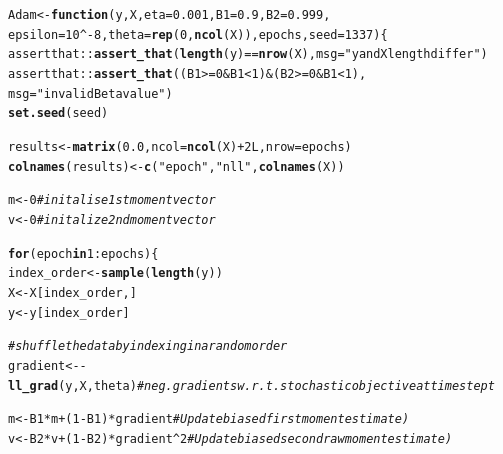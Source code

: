 \documentclass[11pt, a4paper, english]{article}\usepackage[]{graphicx}\usepackage[dvipsnames]{xcolor}
\makeatletter
\newcommand{\hlnum}[1]{\textcolor[rgb]{0.686,0.059,0.569}{#1}}%
\newcommand{\hlstr}[1]{\textcolor[rgb]{0.192,0.494,0.8}{#1}}%
\newcommand{\hlcom}[1]{\textcolor[rgb]{0.678,0.584,0.686}{\textit{#1}}}%
\newcommand{\hlopt}[1]{\textcolor[rgb]{0,0,0}{#1}}%
\newcommand{\hlstd}[1]{\textcolor[rgb]{0.345,0.345,0.345}{#1}}%
\newcommand{\hlkwa}[1]{\textcolor[rgb]{0.161,0.373,0.58}{\textbf{#1}}}%
\newcommand{\hlkwb}[1]{\textcolor[rgb]{0.69,0.353,0.396}{#1}}%
\newcommand{\hlkwc}[1]{\textcolor[rgb]{0.333,0.667,0.333}{#1}}%
\newcommand{\hlkwd}[1]{\textcolor[rgb]{0.737,0.353,0.396}{\textbf{#1}}}%
\newenvironment{kframe}{%
 \def\at@end@of@kframe{}%
 \ifinner\ifhmode%
  \def\at@end@of@kframe{\end{minipage}}%
  \begin{minipage}{\columnwidth}%
 \fi\fi%
 \def\FrameCommand##1{\hskip\@totalleftmargin \hskip-\fboxsep
 \colorbox{shadecolor}{##1}\hskip-\fboxsep
     \hskip-\linewidth \hskip-\@totalleftmargin \hskip\columnwidth}%
 \MakeFramed {\advance\hsize-\width
   \@totalleftmargin\z@ \linewidth\hsize
   \@setminipage}}%
 {\par\unskip\endMakeFramed%
 \at@end@of@kframe}
\newenvironment{knitrout}{}{} %
\makeatother
\begin{document}
\begin{knitrout}
\color{fgcolor}\begin{kframe}
\begin{alltt}
\hlstd{Adam} \hlkwb{<-} \hlkwa{function}\hlstd{(}\hlkwc{y}\hlstd{,} \hlkwc{X}\hlstd{,} \hlkwc{eta} \hlstd{=} \hlnum{0.001}\hlstd{,} \hlkwc{B1} \hlstd{=} \hlnum{0.9}\hlstd{,} \hlkwc{B2} \hlstd{=} \hlnum{0.999}\hlstd{,}
                 \hlkwc{epsilon} \hlstd{=} \hlnum{10}\hlopt{^-}\hlnum{8}\hlstd{,} \hlkwc{theta} \hlstd{=} \hlkwd{rep}\hlstd{(}\hlnum{0}\hlstd{,} \hlkwd{ncol}\hlstd{(X)),} \hlkwc{epochs}\hlstd{,} \hlkwc{seed}\hlstd{=}\hlnum{1337}\hlstd{)\{}
  \hlstd{assertthat}\hlopt{::}\hlkwd{assert_that}\hlstd{(}\hlkwd{length}\hlstd{(y)} \hlopt{==} \hlkwd{nrow}\hlstd{(X),} \hlkwc{msg}\hlstd{=}\hlstr{"y and X length differ"}\hlstd{)}
  \hlstd{assertthat}\hlopt{::}\hlkwd{assert_that}\hlstd{(( B1} \hlopt{>=} \hlnum{0} \hlopt{&} \hlstd{B1} \hlopt{<} \hlnum{1}\hlstd{)} \hlopt{&} \hlstd{(B2} \hlopt{>=}\hlnum{0} \hlopt{&} \hlstd{B1} \hlopt{<}\hlnum{1} \hlstd{),}
                          \hlkwc{msg} \hlstd{=} \hlstr{"invalid Beta value"}\hlstd{)}
  \hlkwd{set.seed}\hlstd{(seed)}

  \hlstd{results} \hlkwb{<-} \hlkwd{matrix}\hlstd{(}\hlnum{0.0}\hlstd{,} \hlkwc{ncol} \hlstd{=} \hlkwd{ncol}\hlstd{(X)} \hlopt{+} \hlnum{2L}\hlstd{,} \hlkwc{nrow} \hlstd{= epochs)}
  \hlkwd{colnames}\hlstd{(results)} \hlkwb{<-} \hlkwd{c}\hlstd{(}\hlstr{"epoch"}\hlstd{,} \hlstr{"nll"}\hlstd{,} \hlkwd{colnames}\hlstd{(X))}

  \hlstd{m} \hlkwb{<-} \hlnum{0} \hlcom{#initalise 1st moment vector}
  \hlstd{v} \hlkwb{<-} \hlnum{0} \hlcom{#initalize 2nd moment vector}

  \hlkwa{for} \hlstd{(epoch} \hlkwa{in} \hlnum{1}\hlopt{:}\hlstd{epochs) \{}
      \hlstd{index_order} \hlkwb{<-} \hlkwd{sample}\hlstd{(}\hlkwd{length}\hlstd{(y))}
      \hlstd{X} \hlkwb{<-} \hlstd{X[index_order,]}
      \hlstd{y} \hlkwb{<-} \hlstd{y[index_order]}

      \hlcom{#shuffle the data by indexing in a random order}
    \hlstd{gradient} \hlkwb{<-} \hlopt{-}\hlkwd{ll_grad}\hlstd{(y, X, theta)} \hlcom{# neg.gradients w.r.t. stochastic objective at timestep t}

    \hlstd{m} \hlkwb{<-} \hlstd{B1}\hlopt{*}\hlstd{m} \hlopt{+} \hlstd{(}\hlnum{1}\hlopt{-}\hlstd{B1)}\hlopt{*}\hlstd{gradient} \hlcom{# Update biased first moment estimate)}
    \hlstd{v} \hlkwb{<-} \hlstd{B2}\hlopt{*}\hlstd{v} \hlopt{+} \hlstd{(}\hlnum{1}\hlopt{-}\hlstd{B2)}\hlopt{*}\hlstd{gradient}\hlopt{^}\hlnum{2} \hlcom{# Update biased second raw moment estimate)}


\end{alltt}
\end{kframe}
\end{knitrout}
\end{document}

